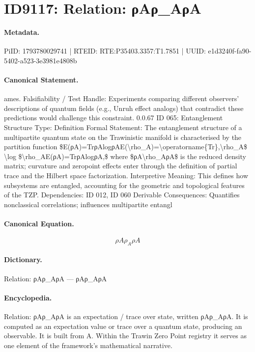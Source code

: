 \section*{ID9117: Relation: ρAρ\_AρA}
\paragraph{Metadata.}
PiID: 1793780029741 | RTEID: RTE:P35403.3357:T1.7851 | UUID: e1d3240f-fa90-5402-a523-3e3981e4808b

\paragraph{Canonical Statement.}
ames. Falsifiability / Test Handle: Experiments comparing different observers’ descriptions of quantum fields (e.g., Unruh effect analogs) that contradict these predictions would challenge this constraint. 0.0.67 ID 065: Entanglement Structure Type: Definition Formal Statement: The entanglement structure of a multipartite quantum state on the Trawinistic manifold is characterised by the partition function \$E(ρA)=TrρAlogρAE(\textbackslash{}rho\_A)=\textbackslash{}operatorname\{Tr\},\textbackslash{}rho\_A\$ \textbackslash{}log \$\textbackslash{}rho\_AE(ρA)=TrρAlogρA,\$ where \$ρA\textbackslash{}rho\_AρA\$ is the reduced density matrix; curvature and zeropoint effects enter through the definition of partial trace and the Hilbert space factorization. Interpretive Meaning: This defines how subsystems are entangled, accounting for the geometric and topological features of the TZP. Dependencies: ID 012, ID 060 Derivable Consequences: Quantifies nonclassical correlations; influences multipartite entangl

\paragraph{Canonical Equation.}
\[
ρA\rho_AρA
\]

\paragraph{Dictionary.}
Relation: ρAρ\_AρA — ρAρ\_AρA

\paragraph{Encyclopedia.}
Relation: ρAρ\_AρA is an expectation / trace over state, written ρAρ\_AρA. It is computed as an expectation value or trace over a quantum state, producing an observable. It is built from A. Within the Trawin Zero Point registry it serves as one element of the framework's mathematical narrative.
